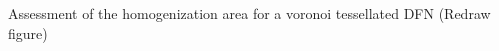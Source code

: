 \label{fig:homoarea} Assessment of the homogenization area for a voronoi tessellated DFN (Redraw figure)
